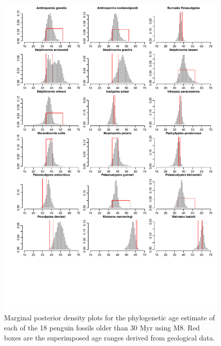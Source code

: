 \documentclass[11pt]{article}
\newcommand{\Mrelaxed}{{M8}}
\begin{document}
\begin{figure}
\includegraphics[width=6in]{run8_5/8_fossilDatingHist_older.pdf}
\caption{\label{hist8_older}Marginal posterior density plots for the phylogenetic age estimate of each of the 18 penguin fossils older than 30 Myr using \Mrelaxed{}. Red boxes are the superimposed age ranges derived from geological data.}
\end{figure}
\end{document}
